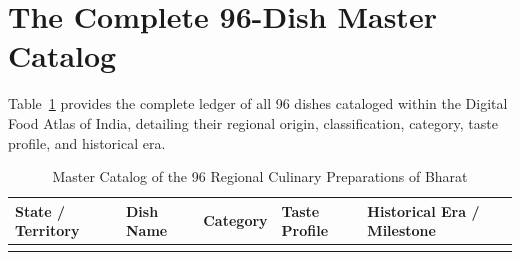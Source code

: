 \documentclass[11pt,a4paper]{report}
\begin{document}
\section{The Complete 96-Dish Master Catalog}
Table~\ref{tab:master_catalog} provides the complete ledger of all 96 dishes cataloged within the Digital Food Atlas of India, detailing their regional origin, classification, category, taste profile, and historical era.

\begin{small}
\begin{longtable}{llllp{4.2cm}}
    \caption{Master Catalog of the 96 Regional Culinary Preparations of Bharat} \label{tab:master_catalog} \\
    \toprule
    \textbf{State / Territory} & \textbf{Dish Name} & \textbf{Category} & \textbf{Taste Profile} & \textbf{Historical Era / Milestone} \\
    \midrule
    \endhead
    \bottomrule
    \endfoot


\end{longtable}
\end{small}
\end{document}

